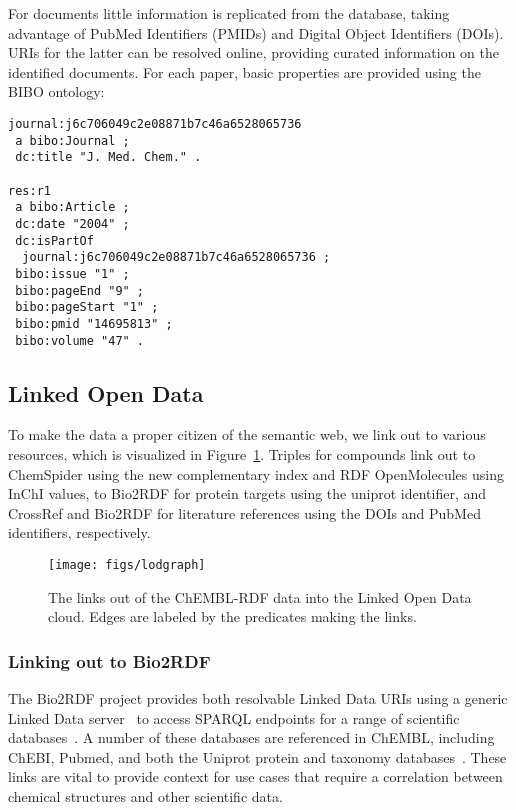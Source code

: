 \documentclass[sw]{iosart2c}
\begin{document}
For documents little information is replicated from the database, taking advantage
of PubMed Identifiers (PMIDs) and Digital Object Identifiers (DOIs). URIs for the
latter can be resolved online, providing curated information on the identified
documents. For each paper, basic properties are provided using the BIBO
ontology:

\begin{footnotesize}
\begin{verbatim}
journal:j6c706049c2e08871b7c46a6528065736
 a bibo:Journal ;
 dc:title "J. Med. Chem." .

res:r1
 a bibo:Article ;
 dc:date "2004" ;
 dc:isPartOf
  journal:j6c706049c2e08871b7c46a6528065736 ;
 bibo:issue "1" ;
 bibo:pageEnd "9" ;
 bibo:pageStart "1" ;
 bibo:pmid "14695813" ;
 bibo:volume "47" .
\end{verbatim}
\end{footnotesize}

\subsection{Linked Open Data}

To make the data a proper citizen of the semantic web, we link out to various resources,
which is visualized in Figure~\ref{2}. Triples for compounds link out to ChemSpider 
using the new complementary index and RDF OpenMolecules using InChI values, to Bio2RDF
for protein targets using the uniprot identifier, and CrossRef and Bio2RDF for literature
references using the DOIs and PubMed identifiers, respectively.

\begin{figure}[t]
\texttt{[image: figs/lodgraph]}
\caption{The links out of the ChEMBL-RDF data into the Linked Open Data cloud.
Edges are labeled by the predicates making the links.}\label{2}
\end{figure}

\subsubsection{Linking out to Bio2RDF}

The Bio2RDF project provides both resolvable Linked Data URIs using a generic Linked Data
server~\cite{Ansell2011} to access SPARQL endpoints for a range of scientific databases~\cite{Belleau2008}.
A number of these databases are referenced in ChEMBL, including ChEBI, Pubmed, and both the
Uniprot protein and taxonomy databases~\cite{TheUniProtConsortium2010}. These links are
vital to provide context for use cases that require a correlation between chemical
structures and other scientific data. 
\end{document}
